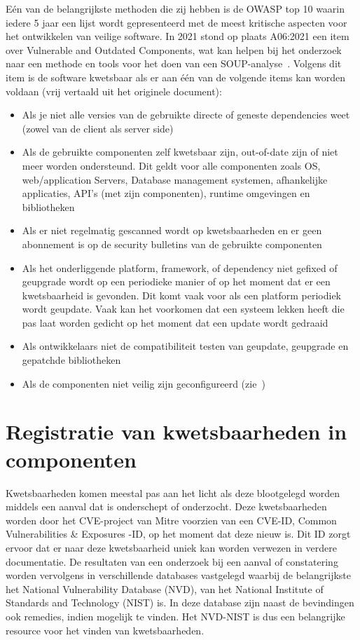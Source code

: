 Eén van de belangrijkste methoden die zij hebben is de OWASP top 10 waarin iedere 5 jaar een lijst wordt gepresenteerd met de meest kritische aspecten voor het ontwikkelen van veilige software. In 2021 stond op plaats A06:2021 een item over Vulnerable and Outdated Components, wat kan helpen bij het onderzoek naar een methode en tools voor het doen van een SOUP-analyse~\citep{OWASP:2021}.
Volgens dit item is de software kwetsbaar als er aan één van de volgende items kan worden voldaan (vrij vertaald uit het originele document):
\begin{itemize}
    \item Als je niet alle versies van de gebruikte directe of geneste dependencies weet (zowel van de client als server side)
    \item Als de gebruikte componenten zelf kwetsbaar zijn, out-of-date zijn of niet meer worden ondersteund. Dit geldt voor alle componenten zoals OS, web/application Servers, Database management systemen, afhankelijke applicaties, API's (met zijn componenten), runtime omgevingen en bibliotheken
    \item Als er niet regelmatig gescanned wordt op kwetsbaarheden en er geen abonnement is op de security bulletins van de gebruikte componenten
    \item Als het onderliggende platform, framework, of dependency niet gefixed of geupgrade wordt op een periodieke manier of op het moment dat er een kwetsbaarheid is gevonden. Dit komt vaak voor als een platform periodiek wordt geupdate. Vaak kan het voorkomen dat een systeem lekken heeft die pas laat worden gedicht op het moment dat een update wordt gedraaid
    \item Als ontwikkelaars niet de compatibiliteit testen van geupdate, geupgrade en gepatchde bibliotheken
    \item Als de componenten niet veilig zijn geconfigureerd (zie~\citep{OWASP:2021})
\end{itemize}


\section{Registratie van kwetsbaarheden in componenten}\label{sec:registratie-van-kwetsbaarheden-in-bibliotheken}
Kwetsbaarheden komen meestal pas aan het licht als deze blootgelegd worden middels een aanval dat is onderschept of onderzocht. Deze kwetsbaarheden worden door het CVE-project van Mitre voorzien van een CVE-ID, Common Vulnerabilities \& Exposures -ID, op het moment dat deze nieuw is. Dit ID zorgt ervoor dat er naar deze kwetsbaarheid uniek kan worden verwezen in verdere documentatie. De resultaten van een onderzoek bij een aanval of constatering worden vervolgens in verschillende databases vastgelegd waarbij de belangrijkste het National Vulnerability Database (NVD), van het National Institute of Standards and Technology (NIST) is.
In deze database zijn naast de bevindingen ook remedies, indien mogelijk te vinden. Het NVD-NIST is dus een belangrijke resource voor het vinden van kwetsbaarheden.

